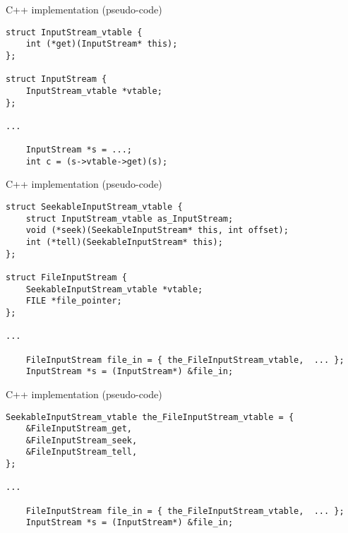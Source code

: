 \begin{frame}[fragile,label=CPPImpl]{C++ implementation (pseudo-code)}
\lstset{
    language=C,style=smaller,
}
\begin{lstlisting}
struct InputStream_vtable {
    int (*get)(InputStream* this);
};

struct InputStream {
    InputStream_vtable *vtable;
};

...

    InputStream *s = ...;
    int c = (s->vtable->get)(s);
\end{lstlisting}
\end{frame}

\begin{frame}[fragile,label=CPPImplB]{C++ implementation (pseudo-code)}
\lstset{
    language=C,style=smaller,
}
\begin{lstlisting}
struct SeekableInputStream_vtable {
    struct InputStream_vtable as_InputStream;
    void (*seek)(SeekableInputStream* this, int offset);
    int (*tell)(SeekableInputStream* this);
};

struct FileInputStream {
    SeekableInputStream_vtable *vtable;
    FILE *file_pointer;
};

...

    FileInputStream file_in = { the_FileInputStream_vtable,  ... };
    InputStream *s = (InputStream*) &file_in;
\end{lstlisting}
\end{frame}

\begin{frame}[fragile,label=CPPImplC]{C++ implementation (pseudo-code)}
\lstset{
    language=C,style=smaller,
}
\begin{lstlisting}
SeekableInputStream_vtable the_FileInputStream_vtable = {
    &FileInputStream_get,
    &FileInputStream_seek,
    &FileInputStream_tell,
};

...

    FileInputStream file_in = { the_FileInputStream_vtable,  ... };
    InputStream *s = (InputStream*) &file_in;
\end{lstlisting}
\end{frame}


